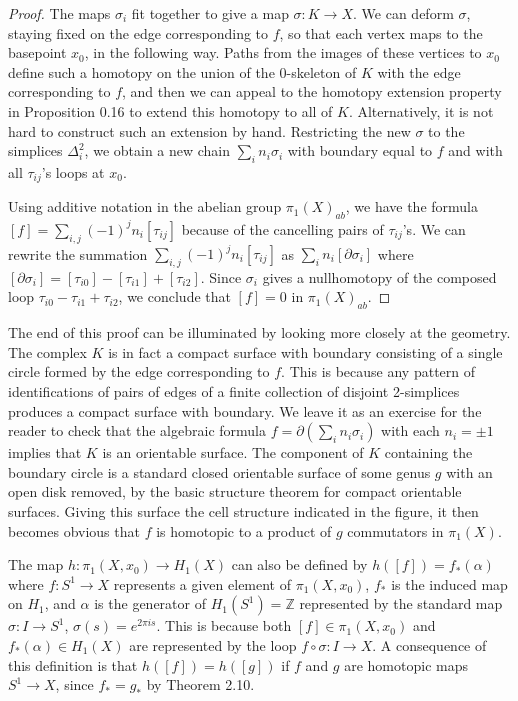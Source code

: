 \begin{proof}
The maps $\sigma_i$ fit together to give a map $\sigma : K \to X$. We can deform $\sigma$, staying fixed on the edge corresponding to $f$, so that each vertex maps to the basepoint $x_0$, in the following way. Paths from the images of these vertices to $x_0$ define such a homotopy on the union of the 0-skeleton of $K$ with the edge corresponding to $f$, and then we can appeal to the homotopy extension property in Proposition 0.16 to extend this homotopy to all of $K$. Alternatively, it is not hard to construct such an extension by hand. Restricting the new $\sigma$ to the simplices $\Delta_i^2$, we obtain a new chain $\sum_i n_i\sigma_i$ with boundary equal to $f$ and with all $\tau_{ij}$'s loops at $x_0$.

Using additive notation in the abelian group $\pi_1(X)_{ab}$, we have the formula $[f] = \sum_{i,j}(-1)^j n_i[\tau_{ij}]$ because of the cancelling pairs of $\tau_{ij}$'s. We can rewrite the summation $\sum_{i,j}(-1)^j n_i[\tau_{ij}]$ as $\sum_i n_i[\partial \sigma_i]$ where $[\partial \sigma_i] = [\tau_{i0}] - [\tau_{i1}] + [\tau_{i2}]$. Since $\sigma_i$ gives a nullhomotopy of the composed loop $\tau_{i0} - \tau_{i1} + \tau_{i2}$, we conclude that $[f] = 0$ in $\pi_1(X)_{ab}$.
\end{proof}
The end of this proof can be illuminated by looking more closely at the geometry. The complex $K$ is in fact a compact surface with boundary consisting of a single circle formed by the edge corresponding to $f$. This is because any pattern of identifications of pairs of edges of a finite collection of disjoint 2-simplices produces a compact surface with boundary. We leave it as an exercise for the reader to check that the algebraic formula $f = \partial(\sum_i n_i \sigma_i)$ with each $n_i = \pm 1$ implies that $K$ is an orientable surface. The component of $K$ containing the boundary circle is a standard closed orientable surface of some genus $g$ with an open disk removed, by the basic structure theorem for compact orientable surfaces. Giving this surface the cell structure indicated in the figure, it then becomes obvious that $f$ is homotopic to a product of $g$ commutators in $\pi_1(X)$.



The map $h:\pi_1(X,x_0) \to H_1(X)$ can also be defined by $h([f]) = f_* (\alpha)$ where $f:S^1 \to X$ represents a given element of $\pi_1(X,x_0)$, $f_*$ is the induced map on $H_1$, and $\alpha$ is the generator of $H_1(S^1) = \mathbb{Z}$ represented by the standard map $\sigma:I \to S^1$, $\sigma(s) = e^{2\pi i s}$. This is because both $[f] \in \pi_1(X,x_0)$ and $f_*(\alpha) \in H_1(X)$ are represented by the loop $f \circ \sigma: I \to X$. A consequence of this definition is that $h([f]) = h([g])$ if $f$ and $g$ are homotopic maps $S^1 \to X$, since $f_* = g_*$ by Theorem 2.10.

